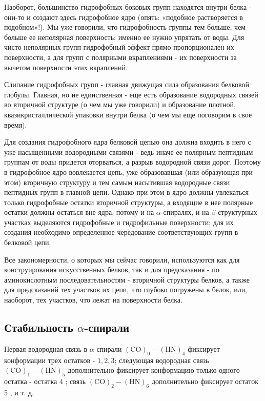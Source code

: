 \documentclass[
11pt,%
tightenlines,%
twoside,%
onecolumn,%
nofloats,%
nobibnotes,%
nofootinbib,%
superscriptaddress,%
noshowpacs,%
centertags]%
{revtex4}
\begin{document}
Наоборот, большинство гидрофобных боковых групп находятся внутри белка - они-то и создают здесь гидрофобное ядро (опять: «подобное растворяется в подобном»!). Мы уже говорили, что гидрофобность группы тем больше, чем больше ее неполярная поверхность: именно ее нужно упрятать от воды. Для чисто неполярных групп гидрофобный эффект прямо пропорционален их поверхности, а для групп с полярными вкраплениями - их поверхности за вычетом поверхности этих вкраплений.

Слипание гидрофобных групп - главная движущая сила образования белковой глобулы. Главная, но не единственная - еще есть образование водородных связей во вторичной структуре (о чем мы уже говорили) и образование плотной, квазикристаллической упаковки внутри белка (о чем мы еще поговорим в свое время).

Для создания гидрофобного ядра белковой цепью она должна входить в него с уже насыщенными водородными связями - ведь иначе ее полярным пептидным группам от воды придется оторваться, а разрыв водородной связи дорог. Поэтому в гидрофобное ядро вовлекается цепь, уже образовавшая (или образующая при этом) вторичную структуру и тем самым насытившая водородные связи пептидных групп в главной цепи. Однако при этом в ядро должны увлекаться только гидрофобные остатки вторичной структуры, а входящие в нее полярные остатки должны остаться вне ядра, потому и на $\alpha$-спиралях, и на $\beta$-структурных участках выделяются гидрофобные и гидрофильные поверхности; для их создания необходимо определенное чередование соответствующих групп в белковой цепи.

Все закономерности, о которых мы сейчас говорили, используются как для конструирования искусственных белков, так и для предсказания - по аминокислотным последовательностям - вторичной структуры белков, а также для предсказаний тех участков их цепи, что глубоко погружены в белок, или, наоборот, тех участков, что лежат на поверхности белка.

\newpage
\subsection{Стабильность $\alpha$-спирали}
Первая водородная связь в $\alpha$-спирали $(\mathrm{CO})_0-(\mathrm{HN})_4$ фиксирует конформации трех остатков - $1,2,3$; следующая водородная связь $(\mathrm{CO})_1-(\mathrm{HN})_5$ дополнительно фиксирует конформацию только одного остатка - остатка 4 ; связь $(\mathrm{CO})_2-(\mathrm{HN})_6$ дополнительно фиксирует остаток 5 , и т. д.
\end{document}
